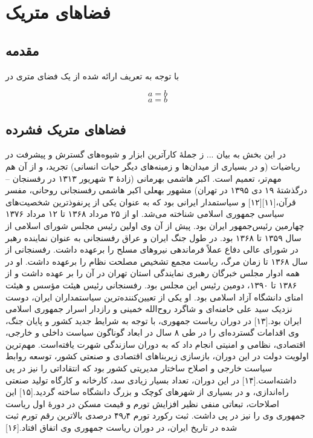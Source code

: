 \chapter{فضاهای متریک }
\thispagestyle{empty}

\section{مقدمه }
با توجه به تعریف ارائه شده از یک  فضای متری در  
\cite{rud}


\begin{equation}
a = b
\end{equation}
\begin{equation}
a = b
\end{equation}


\section{فضاهای متریک فشرده }
در این  بخش به بیان ...
ز جملهٔ کارآترین ابزار و شیوه‌های گسترش و پیشرفت در ریاضیات (و در بسیاری از میدان‌ها و زمینه‌های دیگر حیات انسانی) تجرید، و از آن هم مهم‌تر، تعمیم است.
اکبر هاشمی بهرمانی (زادهٔ ۳ شهریور ۱۳۱۳ در رفسنجان – درگذشتهٔ ۱۹ دی ۱۳۹۵ در تهران) مشهور بهعلی اکبر هاشمی رفسنجانی روحانی، مفسر قرآن،[۱۱][۱۲] و سیاستمدار ایرانی بود که به عنوان یکی از پرنفوذترین شخصیت‌های سیاسی جمهوری اسلامی شناخته می‌شد. او از ۲۵ مرداد ۱۳۶۸ تا ۱۲ مرداد ۱۳۷۶ چهارمین رئیس‌جمهور ایران بود. پیش از آن وی اولین رئیس مجلس شورای اسلامی از سال ۱۳۵۹ تا ۱۳۶۸ بود. در طول جنگ ایران و عراق رفسنجانی به عنوان نماینده رهبر در شورای عالی دفاع عملاً فرماندهی نیروهای مسلح را برعهده داشت. رفسنجانی از سال ۱۳۶۸ تا زمان مرگ، ریاست مجمع تشخیص مصلحت نظام را برعهده داشت. او در همه ادوار مجلس خبرگان رهبری نمایندگی استان تهران در آن را بر عهده داشت و از ۱۳۸۶ تا ۱۳۹۰، دومین رئیس این مجلس بود. رفسنجانی رئیس هیئت مؤسس و هیئت امنای دانشگاه آزاد اسلامی بود.
او یکی از تعیین‌کننده‌ترین سیاستمداران ایران، دوست نزدیک سید علی خامنه‌ای و شاگرد روح‌الله خمینی و رازدار اسرار جمهوری اسلامی ایران بود.[۱۳] در دوران ریاست جمهوری، با توجه به شرایط جدید کشور و پایان جنگ، وی اقدامات گسترده‌ای را در طی ۸ سال در ابعاد گوناگون سیاست داخلی و خارجی، اقتصادی، نظامی و امنیتی انجام داد که به دوران سازندگی شهرت یافته‌است. مهم‌ترین اولویت دولت در این دوران، بازسازی زیربناهای اقتصادی و صنعتی کشور، توسعه روابط سیاست خارجی و اصلاح ساختار مدیریتی کشور بود که انتقاداتی را نیز در پی داشته‌است.[۱۴] در این دوران، تعداد بسیار زیادی سد، کارخانه و کارگاه تولید صنعتی راه‌اندازی، و در بسیاری از شهرهای کوچک و بزرگ دانشگاه ساخته گردید.[۱۵] این اصلاحات، تبعاتی منفی نظیر افزایش تورم و قیمت مسکن در دورهٔ اول ریاست جمهوری وی را نیز در پی داشت. ثبت رکورد تورم ۴۹٫۴ درصدی بالاترین رقم تورم ثبت شده در تاریخ ایران، در دوران ریاست جمهوری وی اتفاق افتاد.[۱۶]
